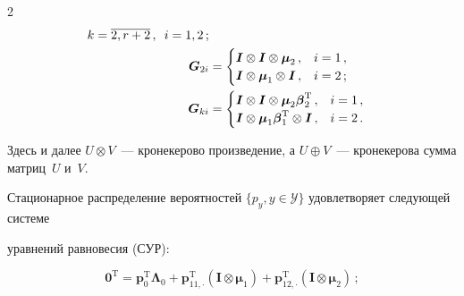 \begin{multicols}{2}
\begin{align*}
 k=\overline{2,r+2}\,, \enskip

 i=1,2\,;\\

\boldsymbol{G}_{2i}&=

\begin{cases}

\boldsymbol{I}\otimes \boldsymbol{I}\otimes

\boldsymbol{\mu}_2\,, & i=1\,,\\

\boldsymbol{I} \otimes \boldsymbol{\mu}_1 \otimes \boldsymbol{I}\,, & i=2\,;

\end{cases}

\\


\boldsymbol{G}_{ki}&=

\begin{cases}

\boldsymbol{I}\otimes \boldsymbol{I}\otimes

\boldsymbol{\mu}_2\boldsymbol{\beta}_2^{\mathrm{T}}\,, & i=1\,,\\

\boldsymbol{I} \otimes \boldsymbol{\mu}_1\boldsymbol{\beta}_1^{\mathrm{T}} \otimes \boldsymbol{I}\,, & i=2\,.

\end{cases}

\end{align*}

Здесь и далее $U\otimes V$~--- кронекерово произведение, а $U\oplus V$~--- кронекерова сумма матриц~$U$ и~$V$.



Стационарное распределение вероятностей $\{p_y, y\in\mathcal{Y}\}$ удовлетворяет следующей системе 

уравнений равновесия (СУР):

\begin{equation}

\label{eq:1}

\boldsymbol{0}^{\mathrm{T}}=\boldsymbol{p}_0^{\mathrm{T}} \boldsymbol{\Lambda}_0+

\boldsymbol{p}_{11,\cdot}^{\mathrm{T}}\left(

\boldsymbol{I}\otimes\boldsymbol{\mu}_1\right) + \boldsymbol{p}_{12,\cdot}^{\mathrm{T}}\left(\boldsymbol{I}\otimes \boldsymbol{\mu}_2\right)\,;

\end{equation}


\end{multicols}
